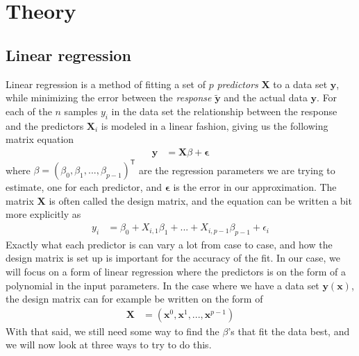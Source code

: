 \documentclass{article}
\newcommand{\XX}{\mathbf{X}}
\newcommand{\T}{\mathsf{T}}
\begin{document}
\section{Theory} \label{chap:theory}
\subsection{Linear regression} \label{sec:linreg}
Linear regression is a method of fitting a set of $p$ \textit{predictors} $\bm{X}$ to a data set $\bm{y}$, while minimizing the error between the \textit{response} $\bm{\tilde y}$ and the actual data $\bm{y}$. For each of the $n$ samples $y_i$ in the data set the relationship between the response and the predictors $\bm{X}_i$ is modeled in a linear fashion, giving us the following matrix equation
\begin{align*}
	\mathbf{y} &= \XX\beta + \bm{\epsilon}
\end{align*}
where $\beta = (\beta_0, \beta_1, ..., \beta_ {p-1})^\T$ are the regression parameters we are trying to estimate, one for each predictor, and $\bm{\epsilon}$ is the error in our approximation. The matrix $\XX$ is often called the design matrix, and the equation can be written a bit more explicitly as
\begin{align*}
	y_i &= \beta_0 + X_{i,1}\beta_1 + ... + X_{i,p-1}\beta_{p-1} + \epsilon_i
\end{align*}
Exactly what each predictor is can vary a lot from case to case, and how the design matrix is set up is important for the accuracy of the fit. In our case, we will focus on a form of linear regression where the predictors is on the form of a polynomial in the input parameters. In the case where we have a data set $\bm{y}(\bm{x})$, the design matrix can for example be written on the form of
\begin{align*}
	\XX &= (\bm{x}^0, \bm{x}^1, ... , \bm{x}^{p-1})
\end{align*} 
With that said, we still need some way to find the $\beta$'s that fit the data best, and we will now look at three ways to try to do this.
\end{document}
